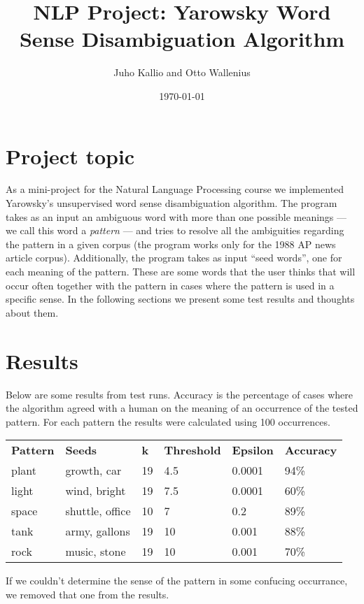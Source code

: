 \documentclass[finnish]{article}
\title{NLP Project: Yarowsky Word Sense Disambiguation Algorithm}
\author{Juho Kallio and Otto Wallenius}
\date{\today}
\begin{document}
\maketitle
\section{Project topic}

As a mini-project for the Natural Language Processing course we implemented Yarowsky's unsupervised word sense disambiguation algorithm. The program takes as an input an ambiguous word with more than one possible meanings --- we call this word a \emph{pattern} --- and tries to resolve all the ambiguities regarding the pattern in a given corpus (the program works only for the 1988 AP news article corpus). Additionally, the program takes as input ``seed words'', one for each meaning of the pattern. These are some words that the user thinks that will occur often together with the pattern in cases where the pattern is used in a specific sense. In the following sections we present some test results and thoughts about them.

\section{Results}
Below are some results from test runs. Accuracy is the percentage of cases where the algorithm agreed with a human on the meaning of an occurrence of the tested pattern. For each pattern the results were calculated using 100 occurrences.

\begin{tabular}{l l l l l l}

\textbf{Pattern} & \textbf{Seeds} & \textbf{k} & \textbf{Threshold} & \textbf{Epsilon} & \textbf{Accuracy} \\
plant   & growth, car     & 19 & 4.5 & 0.0001 & 94\% \\
light   & wind, bright    & 19 & 7.5 & 0.0001 & 60\% \\
space   & shuttle, office & 10 & 7   & 0.2    & 89\% \\
tank    & army, gallons   & 19 & 10  & 0.001  & 88\% \\
rock    & music, stone    & 19 & 10  & 0.001  & 70\% 
\end{tabular}

If we couldn't determine the sense of the pattern in some confucing occurrance, we removed that one from the results.
\end{document}
